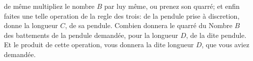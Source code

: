 de m\^{e}me multipliez le nombre $B$ par luy m\^{e}me, ou prenez son quarr\'{e};
et enfin faites une telle operation de la regle des trois:
\pend%
\newpage%
\pstart%
de la pendule prise \`{a} discretion, donne la longueur $C$, de sa pendule.
\pend%
\pstart%
Combien donnera le quarr\'{e} du Nombre
$B$ des battements de la pendule demand\'{e}e,
pour la longueur $D$, de la dite pendule.
\pend%
\pstart%
Et le produit de cette operation, vous donnera la dite longueur $D$, que vous aviez demand\'{e}e.
\pend
\count{}
	\count{}

